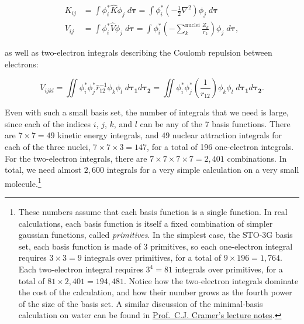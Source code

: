 \documentclass[
  english,
  9pt,
]{extbook}
\theoremstyle{definition}
\theoremstyle{definition}
\theoremstyle{definition}
\theoremstyle{definition}
\theoremstyle{remark}
\begin{document}
\begin{equation}
\begin{aligned}
\displaystyle K_{ij} &= \int \phi_i^* {\hat K} \phi_j\; d\mathbf{\tau}=\int \phi_i^* {\left(-\frac{1}{2}\nabla^2\right)} \phi_j\; d\mathbf{\tau} \\
\displaystyle V_{ij} &= \int \phi_i^* {\hat V} \phi_j\;d\mathbf{\tau} = \int \phi_i^* {\left(-\sum_k^{\mathrm{nuclei}}\frac{Z_k}{r_k}\right)} \phi_j\; d\mathbf{\tau} ,
\end{aligned}
\label{eq:oneelint}
\end{equation}

as well as two-electron integrals describing the Coulomb repulsion between electrons:

\begin{equation}
V_{ijkl} = \iint \phi_i^* \phi_j^* {\hat r}_{12}^{-1} \phi_k \phi_l\; d\mathbf{\tau_1}d\mathbf{\tau_2}=\iint \phi_i^* \phi_j^* \left(\frac{1}{r_{12}}\right) \phi_k \phi_l\; d\mathbf{\tau_1}d\mathbf{\tau_2}.
\label{eq:twoelint}
\end{equation}

Even with such a small basis set, the number of integrals that we need is large, since each of the indices \(i\), \(j\), \(k\), and \(l\) can be any of the 7 basis functions. There are \(7\times7=49\) kinetic energy integrals, and \(49\) nuclear attraction integrals for each of the three nuclei, \(7\times 7 \times 3 = 147\), for a total of 196 one-electron integrals. For the two-electron integrals, there are \(7 \times 7 \times 7 \times 7 = 2{,}401\) combinations. In total, we need almost \(2{,}600\) integrals for a very simple calculation on a very small molecule.\footnote{These numbers assume that each basis function is a single function. In real calculations, each basis function is itself a fixed combination of simpler gaussian functions, called \emph{primitives}. In the simplest case, the STO-3G basis set, each basis function is made of 3 primitives, so each one-electron integral requires \(3 \times 3 = 9\) integrals over primitives, for a total of \(9 \times 196 = 1{,}764\). Each two-electron integral requires \(3^4 = 81\) integrals over primitives, for a total of \(81 \times 2{,}401 = 194{,}481\). Notice how the two-electron integrals dominate the cost of the calculation, and how their number grows as the fourth power of the size of the basis set. A similar discussion of the minimal-basis calculation on water can be found in \href{http://pollux.chem.umn.edu/4502/3502_lecture_29.pdf}{Prof.~C.J. Cramer's lecture notes}.}
\end{document}
